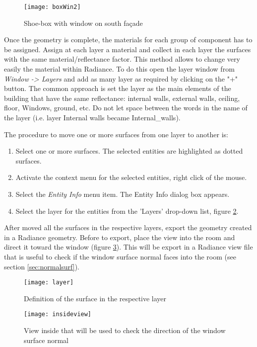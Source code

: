 \begin{figure}[h]
\centering
\texttt{[image: boxWin2]}
\caption{\label{img1:boxWin} Shoe-box with window on south fa\c{c}ade}
\end{figure}

Once the geometry is complete, the materials for each group of component has to be assigned. Assign at each layer a material and collect in each layer the surfaces with the same material/reflectance factor. This method allows to change very easily the material within Radiance. To do this open the layer window from \textit{Window -> Layers} and add as many layer as required by clicking on the "+" button. The common approach is set the layer as the main elements of the building that have the same reflectance: internal walls, 
external walls, ceiling, floor, Windows, ground, etc. Do not let space between the words in the name of the layer (i.e. layer Internal walls became Internal\_walls).

The procedure to move one or more surfaces from one layer to another is:
\begin{enumerate}
\item Select one or more surfaces. The selected entities are highlighted as dotted surfaces.
\item Activate the context menu for the selected entities, right click of the mouse.
\item Select the \textit{Entity Info} menu item. The Entity Info dialog box appears.
\item Select the layer for the entities from the 'Layers' drop-down list, figure \ref{img1:layer}.
\end{enumerate}

After moved all the surfaces in the respective layers, export the geometry created in a Radiance geometry. Before to export, place the view into the room and direct it toward the window (figure \ref{img1:inside}). This will be export in a Radiance view file that is useful to check if the window surface normal faces into the room (see section \ref{sec:normalsurf}). \\


\begin{figure}[h]
\centering
\texttt{[image: layer]}
\caption{\label{img1:layer} Definition of the surface in the respective layer}
\end{figure}


\begin{figure}[H]
\centering
\texttt{[image: insideview]}
\caption{\label{img1:inside} View inside that will be used to check the direction of the window surface normal}
\end{figure}

